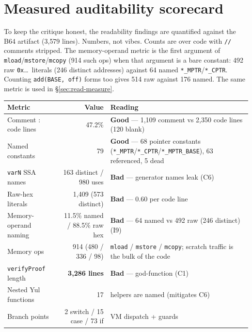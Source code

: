 \section{Measured auditability scorecard}
\label{sec:c-scorecard}

To keep the critique honest, the readability findings are
quantified against the B64 artifact (3{,}579 lines). Numbers,
not vibes. Counts are over code with \texttt{//} comments stripped.
The memory-operand metric is the first argument of
\texttt{mload}/\texttt{mstore}/\texttt{mcopy} (914 such ops) when
that argument is a bare constant: 492 raw \texttt{0x}\ldots\
literals (246 distinct addresses) against 64 named
\texttt{*\_MPTR}/\texttt{*\_CPTR}. Counting \texttt{add(BASE, off)}
forms too gives 514 raw against 176 named. The same metric is used
in \S\ref{sec:read-measure}.

\begin{center}\small
\begin{tabular}{@{}p{5.6cm}rp{5.2cm}@{}}
\toprule
\textbf{Metric} & \textbf{Value} & \textbf{Reading} \\
\midrule
Comment : code lines & 47.2\% & \textcolor{tracegreen}{\textbf{Good}} --- 1{,}109 comment vs 2{,}350 code lines (120 blank) \\
Named constants & 79 & \textcolor{tracegreen}{\textbf{Good}} --- 68 pointer constants (\texttt{*\_MPTR}/\texttt{*\_CPTR}/\texttt{*\_MPTR\_BASE}), 63 referenced, 5 dead \\
\texttt{varN} SSA names & 163 distinct / 980 uses & \textcolor{rustorange}{\textbf{Bad}} --- generator names leak (C6) \\
Raw-hex literals & 1{,}409 (573 distinct) & \textcolor{rustorange}{\textbf{Bad}} --- 0.60 per code line \\
Memory-operand naming & 11.5\% named / 88.5\% raw hex & \textcolor{rustorange}{\textbf{Bad}} --- 64 named vs 492 raw (246 distinct) (I9) \\
Memory ops & 914 (480 / 336 / 98) & \texttt{mload} / \texttt{mstore} / \texttt{mcopy}; scratch traffic is the bulk of the code \\
\texttt{verifyProof} length & \textbf{3{,}286 lines} & \textcolor{rustorange}{\textbf{Bad}} --- god-function (C1) \\
Nested Yul functions & 17 & helpers are named (mitigates C6) \\
Branch points & 2 switch / 15 case / 73 if & VM dispatch + guards \\
\bottomrule
\end{tabular}
\end{center}

